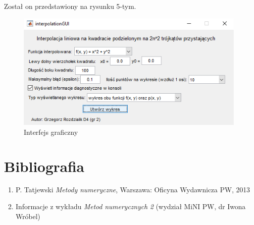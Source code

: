 \documentclass[12pt]{article}
\begin{document}
	Został on przedstawiony na rysunku 5-tym.
	
	\begin{figure}
		\centering
		\includegraphics[scale=1]{images/gui.png}
		\caption{Interfejs graficzny}
	\end{figure}
	
	\pagebreak
	
	\section{Bibliografia}
	\begin{enumerate}
		\item P. Tatjewski \textit{Metody numeryczne}, Warszawa: Oficyna Wydawnicza PW, 2013
		\item Informacje z wykładu \textit{Metod numerycznych 2} (wydział MiNI PW, dr Iwona Wróbel)
	\end{enumerate}
	
\end{document}
